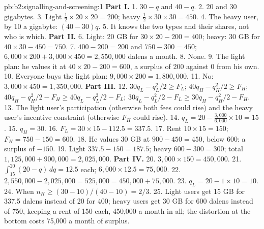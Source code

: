 \begin{solution}{pb:b2:signalling-and-screening:1}
\textbf{Part I.}
1. $30 - q$ and $40 - q$.
2. 20 and 30 gigabytes.
3. Light $\tfrac12 \times 20 \times 20 = 200$; heavy $\tfrac12 \times 30 \times 30 = 450$.
4. The heavy user, by 10 a gigabyte: $(40 - 30)q$.
5. It knows the two types and their shares, not who is which.
\textbf{Part II.}
6. Light: 20 GB for $30 \times 20 - 200 = 400$; heavy: 30 GB for $40 \times 30 - 450 = 750$.
7. $400 - 200 = 200$ and $750 - 300 = 450$; $6{,}000 \times 200 + 3{,}000 \times 450 = 2{,}550{,}000$ dalens a month.
8. None.
9. The light plan: he values it at $40 \times 20 - 200 = 600$, a surplus of 200 against 0 from his own.
10. Everyone buys the light plan: $9{,}000 \times 200 = 1{,}800{,}000$.
11. No: $3{,}000 \times 450 = 1{,}350{,}000$.
\textbf{Part III.}
12. $30q_L - q_L^2/2 \ge F_L$; $40q_H - q_H^2/2 \ge F_H$; $40q_H - q_H^2/2 - F_H \ge 40q_L - q_L^2/2 - F_L$; $30q_L - q_L^2/2 - F_L \ge 30q_H - q_H^2/2 - F_H$.
13. The light user's participation (otherwise both fees could rise) and the heavy user's incentive constraint (otherwise
$F_H$ could rise).
14. $q_L = 20 - \tfrac{3{,}000}{6{,}000} \times 10 = 15$.
15. $q_H = 30$.
16. $F_L = 30 \times 15 - 112.5 = 337.5$.
17. Rent $10 \times 15 = 150$; $F_H = 750 - 150 = 600$.
18. He values 30 GB at $900 - 450 = 450$, below 600: a surplus of $-150$.
19. Light $337.5 - 150 = 187.5$; heavy $600 - 300 = 300$; total $1{,}125{,}000 + 900{,}000 = 2{,}025{,}000$.
\textbf{Part IV.}
20. $3{,}000 \times 150 = 450{,}000$.
21. $\int_{15}^{20}(20 - q)\,dq = 12.5$ each; $6{,}000 \times 12.5 = 75{,}000$.
22. $2{,}550{,}000 - 2{,}025{,}000 = 525{,}000 = 450{,}000 + 75{,}000$.
23. $q_L = 20 - 1 \times 10 = 10$.
24. When $n_H \ge (30 - 10)/(40 - 10) = 2/3$.
25. Light users get 15 GB for 337.5 dalens instead of 20 for 400; heavy users get 30 GB for 600 dalens instead of 750, keeping a
rent of 150 each, 450{,}000 a month in all; the distortion at the bottom costs 75{,}000 a month of surplus.
\end{solution}

